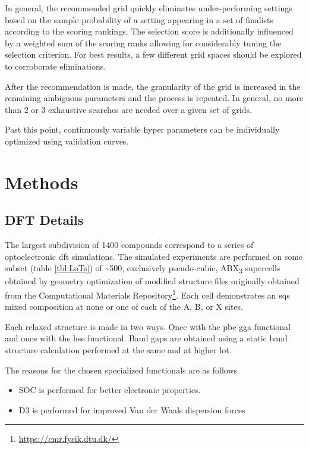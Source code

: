 \documentclass[aip, jmp, amsmath, amssymb]{revtex4-2}
\begin{document}
In general, the recommended grid quickly eliminates under-performing
settings based on the sample probability of a setting appearing in a
set of finalists according to the scoring rankings. The selection
score is additionally influenced by a weighted sum of the scoring
ranks allowing for considerably tuning the selection criterion.  For
best results, a few different grid spaces should be explored to
corroborate eliminations.

After the recommendation is made, the granularity of the grid is
increased in the remaining ambiguous parameters and the process is
repeated. In general, no more than 2 or 3 exhaustive searches are
needed over a given set of grids.

Past this point, continuously variable hyper parameters can be
individually optimized using validation curves.

\section*{Methods}
\label{sec:orga4cb79b}
\subsection*{DFT Details}
\label{sec:orgac3ac41}
The largest subdivision of 1400 compounds correspond to a series of
optoelectronic \acrshort{dft} simulations. The simulated experiments are
performed on some subset (table \ref{tbl:LoTs}) of \textasciitilde{}500, exclusively
pseudo-cubic, ABX\textsubscript{3} supercells obtained by geometry optimization of
modified structure files \cite{pilania-2016-machin-learn} originally
obtained from the Computational Materials Repository\footnote{\url{https://cmr.fysik.dtu.dk/}}. Each cell
demonstrates an \acrshort{sqs} mixed composition at none or one of each of the A,
B, or X sites.

Each relaxed structure is made in two ways. Once with the \acrshort{pbe} \acrshort{gga}
functional and once with the \acrshort{hse} functional. Band gaps are obtained
using a static band structure calculation performed at the same and at
higher \gls{lot}.

The reasons for the chosen specialized functionals are as follows.
\begin{itemize}
\item SOC is performed for better electronic properties.
\item D3 is performed for improved Van der Waals dispersion forces
\end{itemize}
\end{document}
